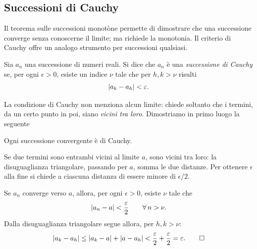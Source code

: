 \subsection{Successioni di Cauchy}

Il teorema sulle successioni monotòne permette di dimostrare che una successione converge
senza conoscerne il limite; ma richiede la monotonia. Il criterio di Cauchy offre un
analogo strumento per successioni qualsiasi.

\begin{definizione}
Sia $a_{n}$ una successione di numeri reali. Si dice che $a_{n}$ è una \emph{successione di
Cauchy} se, per ogni $\epsilon>0$, esiste un indice $\nu$ tale che per $h,k>\nu$ risulti
\begin{equation}\label{eq:cauchy}
  \lvert a_{k}-a_{h}\rvert<\varepsilon .
\end{equation}
\end{definizione}

La condizione di Cauchy non menziona alcun limite: chiede soltanto che i termini, da un
certo punto in poi, siano \emph{vicini tra loro}. Dimostriamo in primo luogo la seguente

\begin{proposizione}\label{prop:convergente-cauchy}
Ogni successione convergente è di Cauchy.
\end{proposizione}

\begin{schema}
\end{schema}

\begin{strategia}
Se due termini sono entrambi vicini al limite $a$, sono vicini tra loro: la disuguaglianza
triangolare, passando per $a$, somma le due distanze. Per ottenere $\epsilon$ alla fine
si chiede a ciascuna distanza di essere minore di $\epsilon/2$.
\end{strategia}

\begin{dimostrazione}
Se $a_{n}$ converge verso $a$, allora, per ogni $\epsilon>0$, esiste $\nu$ tale che
\begin{equation}\label{eq:conv-cauchy-1}
  \lvert a_{n}-a\rvert<\frac{\varepsilon}2 \qquad\forall\, n>\nu .
\end{equation}
Dalla disuguaglianza triangolare segue allora, per $h,k>\nu$:
\begin{equation}\label{eq:conv-cauchy-2}
  \lvert a_{k}-a_{h}\rvert\le\lvert a_{k}-a\rvert+\lvert a-a_{h}\rvert<\frac{\varepsilon}2+\frac{\varepsilon}2=\varepsilon. \qedhere
\end{equation}
\end{dimostrazione}

